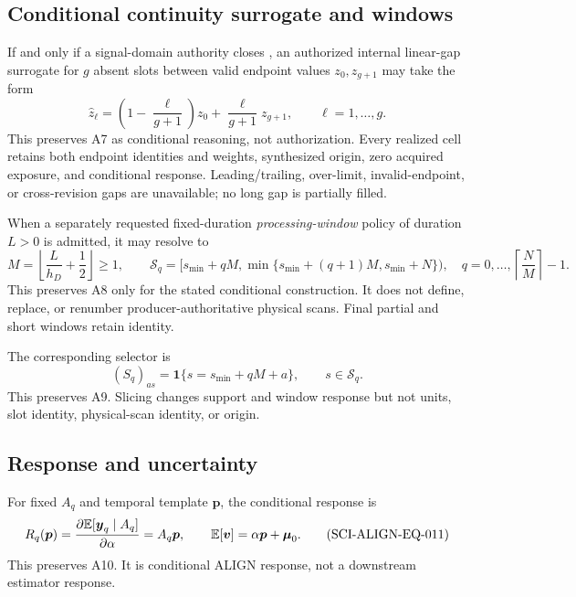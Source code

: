 \subsection{Conditional continuity surrogate and windows}

If and only if a signal-domain authority closes , an
authorized internal linear-gap surrogate for \(g\) absent slots between valid
endpoint values \(z_0,z_{g+1}\) may take the form
\begin{equation}
 \widehat z_\ell=\left(1-\frac{\ell}{g+1}\right)z_0
 +\frac{\ell}{g+1}z_{g+1},
 \qquad \ell=1,\ldots,g.
 \tag{SCI-ALIGN-EQ-008}\label{eq:gap}
\end{equation}
\noindent This preserves A7 as conditional reasoning, not authorization.
Every realized cell retains both endpoint identities and weights, synthesized
origin, zero acquired exposure, and conditional response.  Leading/trailing,
over-limit, invalid-endpoint, or cross-revision gaps are unavailable; no long
gap is partially filled.

When a separately requested fixed-duration \emph{processing-window} policy of
duration \(L>0\) is admitted, it may resolve to
\begin{equation}
 M=\left\lfloor\frac{L}{h_D}+\frac12\right\rfloor\geq1,
 \qquad
 \mathcal S_q=[s_{\min}+qM,\min\{s_{\min}+(q+1)M,s_{\min}+N\}),
 \quad q=0,\ldots,\left\lceil\frac NM\right\rceil-1.
 \tag{SCI-ALIGN-EQ-009}\label{eq:windows}
\end{equation}
\noindent This preserves A8 only for the stated conditional construction.  It
does not define, replace, or renumber producer-authoritative physical scans.
Final partial and short windows retain identity.

The corresponding selector is
\begin{equation}
 (S_q)_{as}=\mathbf 1\{s=s_{\min}+qM+a\},\qquad s\in\mathcal S_q.
 \tag{SCI-ALIGN-EQ-010}\label{eq:selection}
\end{equation}
\noindent This preserves A9.  Slicing changes support and window response but
not units, slot identity, physical-scan identity, or origin.

\subsection{Response and uncertainty}

For fixed \(A_q\) and temporal template \(\boldsymbol p\), the conditional
response is
\begin{equation}
 R_q(\boldsymbol p)=
 \frac{\partial\mathbb{E}[\boldsymbol y_q\mid A_q]}{\partial\alpha}
 =A_q\boldsymbol p,
 \qquad
 \mathbb{E}[\boldsymbol v]=\alpha\boldsymbol p+\boldsymbol\mu_0.
 \tag{SCI-ALIGN-EQ-011}\label{eq:response}
\end{equation}
\noindent This preserves A10.  It is conditional ALIGN response, not a
downstream estimator response.


